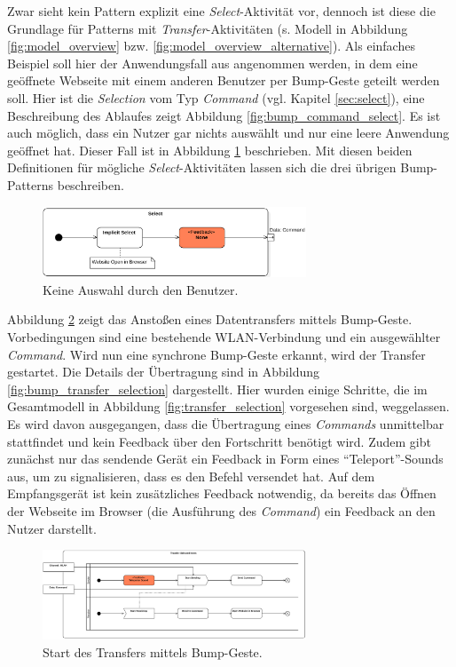 Zwar sieht kein Pattern explizit eine \textit{Select}-Aktivität vor, dennoch ist diese die Grundlage für Patterns mit \textit{Transfer}-Aktivitäten (s. Modell in Abbildung \ref{fig:model_overview} bzw. \ref{fig:model_overview_alternative}). Als einfaches Beispiel soll hier der Anwendungsfall aus \citep{Hinckley2003} angenommen werden, in dem eine geöffnete Webseite mit einem anderen Benutzer per Bump-Geste geteilt werden soll. Hier ist die \textit{Selection} vom Typ \textit{Command} (vgl. Kapitel \ref{sec:select}), eine Beschreibung des Ablaufes zeigt Abbildung \ref{fig:bump_command_select}. Es ist auch möglich, dass ein Nutzer gar nichts auswählt und nur eine leere Anwendung geöffnet hat. Dieser Fall ist in Abbildung \ref{fig:bump_empty_select} beschrieben. Mit diesen beiden Definitionen für mögliche \textit{Select}-Aktivitäten lassen sich die drei übrigen Bump-Patterns beschreiben.

\begin{figure}[h]
\centering
\includegraphics[page=2,width=0.7\textwidth]{bilder/bump/select}
\caption{Keine Auswahl durch den Benutzer.}
\label{fig:bump_empty_select}
\end{figure}

Abbildung \ref{fig:bump_transfer} zeigt das Anstoßen eines Datentransfers mittels Bump-Geste. Vorbedingungen sind eine bestehende WLAN-Verbindung und ein ausgewählter \textit{Command}. Wird nun eine synchrone Bump-Geste erkannt, wird der Transfer gestartet. Die Details der Übertragung sind in Abbildung \ref{fig:bump_transfer_selection} dargestellt. Hier wurden einige Schritte, die im Gesamtmodell in Abbildung \ref{fig:transfer_selection} vorgesehen sind, weggelassen. Es wird davon ausgegangen, dass die Übertragung eines \textit{Commands} unmittelbar stattfindet und kein Feedback über den Fortschritt benötigt wird. Zudem gibt zunächst nur das sendende Gerät ein Feedback in Form eines "`Teleport"'-Sounds aus, um zu signalisieren, dass es den Befehl versendet hat. Auf dem Empfangsgerät ist kein zusätzliches Feedback notwendig, da bereits das Öffnen der Webseite im Browser (die Ausführung des \textit{Command}) ein Feedback an den Nutzer darstellt. 
 
\begin{figure}[h]
\centering
\includegraphics[page=2,width=0.7\textwidth]{bilder/bump/transfer}
\caption{Start des Transfers mittels Bump-Geste.}
\label{fig:bump_transfer}
\end{figure}

